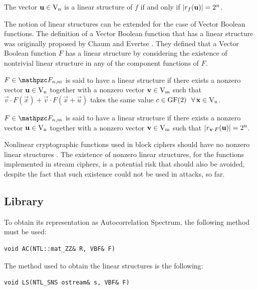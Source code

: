 \begin{definition}
The vector $\vec{u} \in \gf{V_n}$ is a linear structure of $f$  if and only if $|\R_f(\vec{u})|= 2^n$.
\end{definition}

The notion of linear structures can be extended for the case of Vector Boolean functions. The definition of a Vector Boolean function that has a linear structure was originally proposed by Chaum \cite{Chaum:E85} and Evertse \cite{Evertse:87}. They defined that a Vector Boolean function $F$ has a linear structure by considering the existence of nontrivial linear structure in any of the component functions of $F$.

\begin{definition}
$F \in \funct{F}_{n,m}$ is said to have a linear structure if there exists a nonzero vector $\vec{u} \in \gf{V_n}$ together with a nonzero vector $\vec{v} \in \gf{V_m}$ such that $\vec{v} \cdot F(\vec{x}) + \vec{v} \cdot F(\vec{x}+ \vec{u})$ takes the same value $c \in \gf{GF(2)} \ \ \fa \vec{x} \in \gf{V_n}$. 
\end{definition}

\begin{definition}
$F \in \funct{F}_{n,m}$ is said to have a linear structure if there exists a nonzero vector $\vec{u} \in \gf{V_n}$ together with a nonzero vector $\vec{v} \in \gf{V_m}$ such that $|\R_{\vec{v} \cdot F}(\vec{u})|= 2^n$.
\end{definition}

Nonlinear cryptographic functions used in block ciphers should have no nonzero linear structures \cite{Evertse:87}. The existence of nonzero linear structures, for the functions implemented in stream ciphers, is a potential risk that should also be avoided, despite the fact that such existence could not be used in attacks, so far.

\subsection{Library}

To obtain its representation as Autocorrelation Spectrum, the following method must be used:

\begin{verbatim}
void AC(NTL::mat_ZZ& R, VBF& F)
\end{verbatim}

The method used to obtain the linear structures is the following:

\begin{verbatim}
void LS(NTL_SNS ostream& s, VBF& F)
\end{verbatim}

